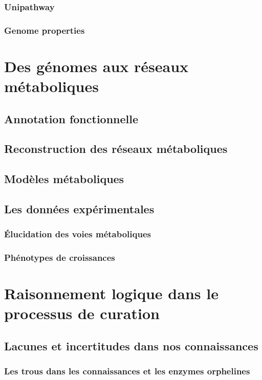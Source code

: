 \begin{refsection}
    \subsubsection{Unipathway}
    \subsubsection{Genome properties}
    
    \section{Des génomes aux réseaux métaboliques}
    \subsection{Annotation fonctionnelle}
    \subsection{Reconstruction des réseaux métaboliques}
    \subsection{Modèles métaboliques}
    \subsection{Les données expérimentales}
    \subsubsection{Élucidation des voies métaboliques}
    \subsubsection{Phénotypes de croissances}
    
    \section{Raisonnement logique dans le processus de curation}
    \subsection{Lacunes et incertitudes dans nos connaissances}
    \subsubsection{Les trous dans les connaissances et les enzymes orphelines}

\end{refsection}
